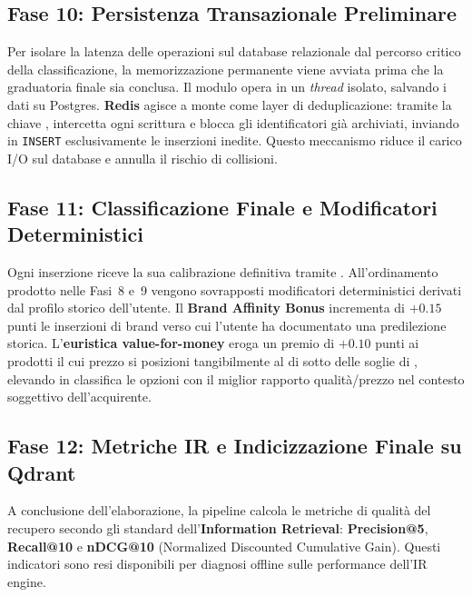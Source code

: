 \subsection*{Fase 10: Persistenza Transazionale Preliminare}
Per isolare la latenza delle operazioni sul database relazionale dal
percorso critico della classificazione, la memorizzazione permanente viene
avviata prima che la graduatoria finale sia conclusa. Il modulo
 opera in un \textit{thread} isolato,
salvando i dati su Postgres. \textbf{Redis} agisce a monte come layer di
deduplicazione: tramite la chiave , intercetta ogni
scrittura e blocca gli identificatori già archiviati, inviando in
\texttt{INSERT} esclusivamente le inserzioni inedite. Questo meccanismo
riduce il carico I/O sul database e annulla il rischio di collisioni.

\subsection*{Fase 11: Classificazione Finale e Modificatori Deterministici}
Ogni inserzione riceve la sua calibrazione definitiva tramite
. All'ordinamento prodotto nelle Fasi~8 e~9
vengono sovrapposti modificatori deterministici derivati dal profilo
storico dell'utente. Il \textbf{Brand Affinity Bonus} incrementa di
\(+0.15\) punti le inserzioni di brand verso cui l'utente ha documentato
una predilezione storica. L'\textbf{euristica value-for-money} eroga un
premio di \(+0.10\) punti ai prodotti il cui prezzo si posizioni
tangibilmente al di sotto delle soglie di ,
elevando in classifica le opzioni con il miglior rapporto qualità/prezzo
nel contesto soggettivo dell'acquirente.

\subsection*{Fase 12: Metriche IR e Indicizzazione Finale su Qdrant}
A conclusione dell'elaborazione, la pipeline calcola le metriche di qualità
del recupero secondo gli standard dell'\textbf{Information Retrieval}:
\textbf{Precision@5}, \textbf{Recall@10} e \textbf{nDCG@10} (Normalized
Discounted Cumulative Gain). Questi indicatori sono resi disponibili per
diagnosi offline sulle performance dell'IR engine.\\

